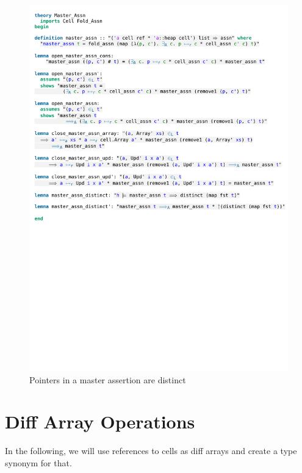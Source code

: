 \begin{figure}[htpb]
    \includegraphics[trim={0 13,1cm 0 15,2cm}, clip, width=1.00\textwidth]{figures/Theory_Master_Assn.pdf}
    \caption[Pointers in a master assertion are distinct]{Pointers in a master assertion are distinct}
    \label{fig:master_assn_distinct}
\end{figure}

\section{Diff Array Operations}\label{section:diff_arr_operations}

In the following, we will use references to cells as diff arrays and create a type synonym for that.

